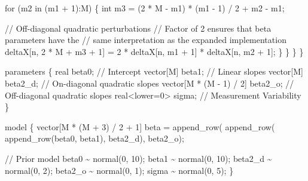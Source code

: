 \documentclass[
  letterpaper,
  DIV=11,
  numbers=noendperiod]{scrartcl}
\newenvironment{Shaded}{\begin{snugshade}}{\end{snugshade}}
\newcommand{\CommentTok}[1]{\textcolor[rgb]{0.37,0.37,0.37}{#1}}
\newcommand{\ControlFlowTok}[1]{\textcolor[rgb]{0.00,0.23,0.31}{#1}}
\newcommand{\DataTypeTok}[1]{\textcolor[rgb]{0.68,0.00,0.00}{#1}}
\newcommand{\DecValTok}[1]{\textcolor[rgb]{0.68,0.00,0.00}{#1}}
\newcommand{\KeywordTok}[1]{\textcolor[rgb]{0.00,0.23,0.31}{#1}}
\newcommand{\NormalTok}[1]{\textcolor[rgb]{0.00,0.23,0.31}{#1}}
\begin{document}
\begin{codelisting}
\begin{Shaded}
\begin{Highlighting}[]
      \ControlFlowTok{for}\NormalTok{ (m2 }\ControlFlowTok{in}\NormalTok{ (m1 + }\DecValTok{1}\NormalTok{):M) \{}
        \DataTypeTok{int}\NormalTok{ m3 = (}\DecValTok{2}\NormalTok{ * M {-} m1) * (m1 {-} }\DecValTok{1}\NormalTok{) / }\DecValTok{2}\NormalTok{ + m2 {-} m1;}
          
        \CommentTok{// Off{-}diagonal quadratic perturbations}
        \CommentTok{// Factor of 2 ensures that beta parameters have the}
        \CommentTok{// same interpretation as the expanded implementation}
\NormalTok{        deltaX[n, }\DecValTok{2}\NormalTok{ * M + m3 + }\DecValTok{1}\NormalTok{] }
\NormalTok{          = }\DecValTok{2}\NormalTok{ * deltaX[n, m1 + }\DecValTok{1}\NormalTok{] * deltaX[n, m2 + }\DecValTok{1}\NormalTok{];}
\NormalTok{      \}}
\NormalTok{    \}}
\NormalTok{  \}}
\NormalTok{\}}

\KeywordTok{parameters}\NormalTok{ \{}
  \DataTypeTok{real}\NormalTok{ beta0;                      }\CommentTok{// Intercept}
  \DataTypeTok{vector}\NormalTok{[M] beta1;                 }\CommentTok{// Linear slopes}
  \DataTypeTok{vector}\NormalTok{[M] beta2\_d;               }\CommentTok{// On{-}diagonal quadratic slopes}
  \DataTypeTok{vector}\NormalTok{[M * (M {-} }\DecValTok{1}\NormalTok{) / }\DecValTok{2}\NormalTok{] beta2\_o; }\CommentTok{// Off{-}diagonal quadratic slopes}
  \DataTypeTok{real}\NormalTok{\textless{}}\KeywordTok{lower}\NormalTok{=}\DecValTok{0}\NormalTok{\textgreater{} sigma;             }\CommentTok{// Measurement Variability}
\NormalTok{\}}

\KeywordTok{model}\NormalTok{ \{}
  \DataTypeTok{vector}\NormalTok{[M * (M + }\DecValTok{3}\NormalTok{) / }\DecValTok{2}\NormalTok{ + }\DecValTok{1}\NormalTok{] beta}
\NormalTok{    = append\_row(}
\NormalTok{        append\_row(}
\NormalTok{          append\_row(beta0, beta1), }
\NormalTok{        beta2\_d), }
\NormalTok{      beta2\_o);}
  
  \CommentTok{// Prior model}
\NormalTok{  beta0 \textasciitilde{} normal(}\DecValTok{0}\NormalTok{, }\DecValTok{10}\NormalTok{);}
\NormalTok{  beta1 \textasciitilde{} normal(}\DecValTok{0}\NormalTok{, }\DecValTok{10}\NormalTok{);}
\NormalTok{  beta2\_d \textasciitilde{} normal(}\DecValTok{0}\NormalTok{, }\DecValTok{2}\NormalTok{);}
\NormalTok{  beta2\_o \textasciitilde{} normal(}\DecValTok{0}\NormalTok{, }\DecValTok{1}\NormalTok{);}
\NormalTok{  sigma \textasciitilde{} normal(}\DecValTok{0}\NormalTok{, }\DecValTok{5}\NormalTok{);}
\NormalTok{\}}


\end{Highlighting}
\end{Shaded}
\end{codelisting}
\end{document}
